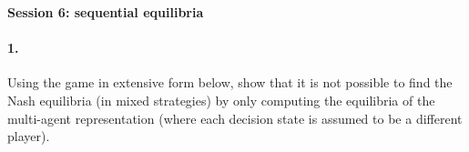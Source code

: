 \documentclass[a4paper,notitlepage,12pt]{article}
\begin{document}
\setlength{\parindent}{0pt}
\setlength{\parskip}{1ex plus 0.5ex minus 0.2ex}


\textbf{Session 6: sequential equilibria}


\paragraph{1. } Using the game in extensive form below, show that it is not possible to find the Nash equilibria (in mixed strategies) by only computing the equilibria of the multi-agent representation (where each decision state is assumed to be a different player).
\end{document}
